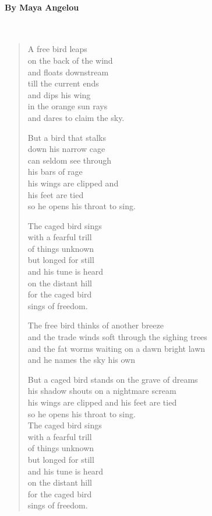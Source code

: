 \paragraph{By Maya Angelou}~
\begin{verse}
	A free bird leaps\\
	on the back of the wind\\
	and floats downstream\\ 
	till the current ends\\
	and dips his wing\\
	in the orange sun rays\\
	and dares to claim the sky.
	
	But a bird that stalks\\
	down his narrow cage\\
	can seldom see through\\
	his bars of rage\\
	his wings are clipped and\\
	his feet are tied\\
	so he opens his throat to sing.
	
	The caged bird sings\\
	with a fearful trill\\ 
	of things unknown\\
	but longed for still\\
	and his tune is heard\\
	on the distant hill\\
	for the caged bird\\
	sings of freedom.
	
	The free bird thinks of another breeze\\
	and the trade winds soft through the sighing trees\\
	and the fat worms waiting on a dawn bright lawn\\
	and he names the sky his own
	
	But a caged bird stands on the grave of dreams\\
	his shadow shouts on a nightmare scream\\
	his wings are clipped and his feet are tied\\
	so he opens his throat to sing.\\
	
	The caged bird sings\\
	with a fearful trill\\ 
	of things unknown\\
	but longed for still\\
	and his tune is heard\\
	on the distant hill\\
	for the caged bird\\
	sings of freedom.\\	
\end{verse}

